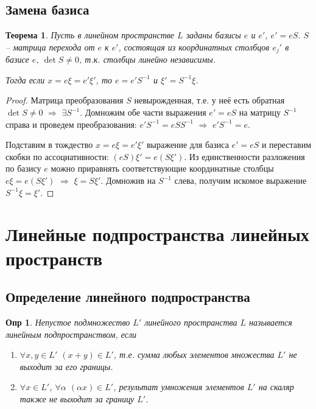 \documentclass[a4paper,12pt]{article}
\newtheorem*{definition}{Опр}
\newtheorem{theorem}{Теорема}[section]
\begin{document}
\subsection{Замена базиса}
\begin{theorem}
	Пусть в линейном пространстве $L$ заданы базисы $e$ и $e'$, $e' = eS$. $S$ -- матрица перехода от $e$ к $e'$, состоящая из координатных столбцов $e_j'$ в базисе $e$, $\det S \ne 0$, т.к. столбцы линейно независимы.
	
	Тогда если $x = e \xi = e' \xi'$, то $e = e' S^{-1}$ и $\xi' = S^{-1} \xi$.
\end{theorem}
\begin{proof}
	Матрица преобразования $S$ невырожденная, т.е. у неё есть обратная $\det S \ne 0$ $\Rightarrow$ $ \exists S^{-1}$. Домножим обе части выражения $e' = eS$ на матрицу $S^{-1}$ справа и проведем преобразования: $e' S^{-1} = e S S^{-1}$ $\Rightarrow$ $e' S^{-1} = e$.
	
	Подставим в тождество $x = e \xi = e' \xi'$ выражение для базиса $e' = eS$ и переставим скобки по ассоциативности: $(eS) \xi' = e(S\xi')$. Из единственности разложения по базису $e$  можно приравнять соответствующие координатные столбцы $e \xi = e (S \xi')$ $\Rightarrow$ $\xi = S \xi'$. Домножив на $S^{-1}$ слева, получим искомое выражение $S^{-1} \xi = \xi'$.
\end{proof}


\section{Линейные подпространства линейных пространств}

\subsection{Определение линейного подпространства}

\begin{definition}
	Непустое подмножество $L'$ линейного пространства $L$ называется линейным подпространством, если 
	\begin{enumerate}
		\item $\forall x, y \in L'$  $(x + y) \in L'$, т.е. сумма любых элементов множества $L'$ не выходит за его границы.
		\item $\forall x \in L'$, $\forall \alpha$ $(\alpha x ) \in L'$, результат умножения элементов $L'$ на скаляр также не выходит за границу $L'$.
	\end{enumerate}
\end{definition}
\end{document}
